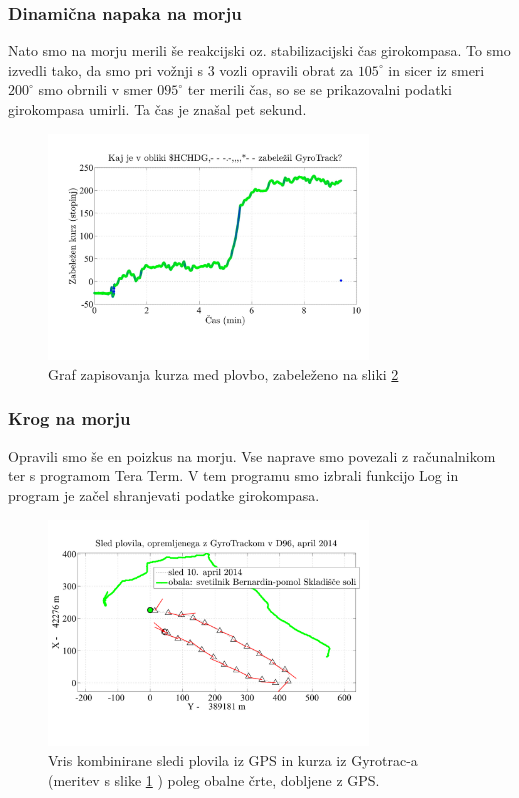 \subsubsection{Dinamična napaka na morju}
Nato smo na morju merili še reakcijski oz. stabilizacijski čas girokompasa. To smo izvedli tako, da smo pri vožnji s 3 vozli opravili obrat za $105^{\circ}$ in sicer iz smeri $200^{\circ}$ smo obrnili v smer $095^{\circ}$ ter merili čas, so se se prikazovalni podatki girokompasa umirli. Ta čas je znašal pet sekund.
\begin{figure}
	\centering
	\includegraphics[height=6cm]{2014-04-10_KurzPoti_Gyrotrack}
	\caption{Graf zapisovanja kurza med plovbo, zabeleženo na sliki \ref{fig:GyroGps_sled}}
	\label{fig:Gyro_krog}       %
\end{figure}


\subsubsection{Krog na morju}
Opravili smo še en poizkus na morju. Vse naprave smo povezali z računalnikom ter s programom Tera Term. V tem programu smo izbrali funkcijo Log in program je začel shranjevati podatke girokompasa.

\begin{figure}
	\centering
	\includegraphics[height=6cm]{SledPlovilaZGyrotrackom_KurzSamoOdNmeaGps}
	\caption{Vris kombinirane sledi plovila iz GPS in kurza iz Gyrotrac-a (meritev s slike \ref{fig:Gyro_krog} ) poleg obalne črte, dobljene z GPS.}
	\label{fig:GyroGps_sled}       %
\end{figure}

